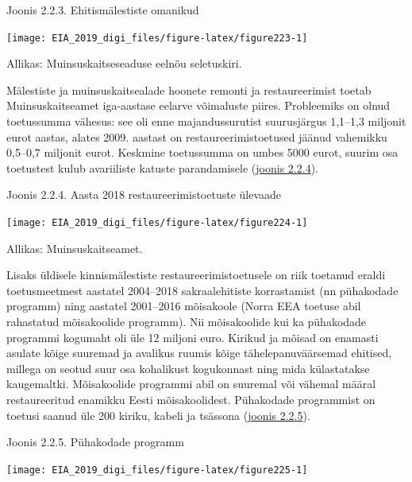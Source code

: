 \documentclass[estonian,]{article}
\begin{document}
{Joonis 2.2.3.} Ehitismälestiste omanikud

\begin{center}\texttt{[image: EIA\_2019\_digi\_files/figure-latex/figure223-1]} \end{center}

\begin{imgsource}
{Allikas:} Muinsuskaitseseaduse eelnõu seletuskiri.
\end{imgsource}

Mälestiste ja muinsuskaitsealade hoonete remonti ja restaureerimist toetab Muinsuskaitseamet iga-aastase eelarve võimaluste piires. Probleemiks on olnud toetussumma vähesus: see oli enne majandussurutist suurusjärgus 1,1--1,3 miljonit eurot aastas, alates 2009. aastast on restaureerimistoetused jäänud vahemikku 0,5--0,7 miljonit eurot. Keskmine toetussumma on umbes 5000 eurot, suurim osa toetustest kulub avariiliste katuste parandamisele (\protect\hyperlink{figure224}{joonis 2.2.4}).

{Joonis 2.2.4.} Aasta 2018 restaureerimistoetuste ülevaade

\begin{center}\texttt{[image: EIA\_2019\_digi\_files/figure-latex/figure224-1]} \end{center}

\begin{imgsource}
{Allikas:} Muinsuskaitseamet.
\end{imgsource}

Lisaks üldisele kinnismälestiste restaureerimistoetusele on riik toetanud eraldi toetusmeetmest aastatel 2004--2018 sakraalehitiste korrastamist (nn pühakodade programm) ning aastatel 2001--2016 mõisakoole (Norra EEA toetuse abil rahastatud mõisakoolide programm). Nii mõisakoolide kui ka pühakodade programmi kogumaht oli üle 12 miljoni euro. Kirikud ja mõisad on enamasti asulate kõige suuremad ja avalikus ruumis kõige tähelepanuväärsemad ehitised, millega on seotud suur osa kohalikust kogukonnast ning mida külastatakse kaugemaltki.
Mõisakoolide programmi abil on suuremal või vähemal määral restaureeritud enamikku Eesti mõisakoolidest. Pühakodade programmist on toetusi saanud üle 200 kiriku, kabeli ja tsässona (\protect\hyperlink{figure225}{joonis 2.2.5}).

{Joonis 2.2.5.} Pühakodade programm

\begin{center}\texttt{[image: EIA\_2019\_digi\_files/figure-latex/figure225-1]} \end{center}
\end{document}
